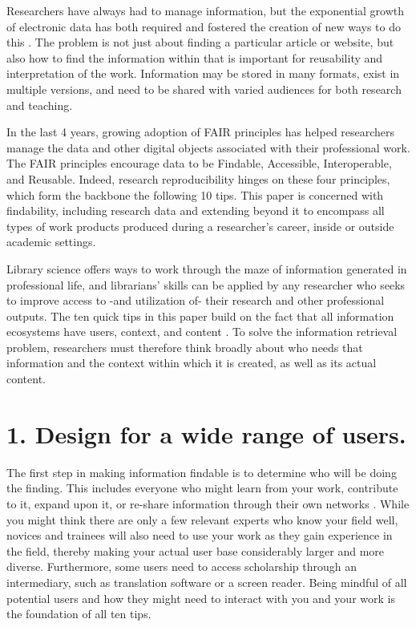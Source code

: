 \documentclass[10pt,letterpaper]{article}
\newcommand{\rulemajor}[1]{\section*{#1}}
\begin{document}
Researchers have always had to manage information, but the exponential growth of
electronic data has both required and fostered the creation of new ways to do
this \cite{Rosenfeld2015,Hedden2016}. The problem is not just about finding a
particular article or website, but also how to find the information within that is 
important for reusability and interpretation of the work. Information may be stored
in many formats, exist in multiple versions, and need to be shared with varied audiences
for both research and teaching.

In the last 4 years, growing adoption of FAIR principles \cite{Wilkinson2016}
has helped researchers manage the data and other digital objects associated with
their professional work. The FAIR principles encourage data to be Findable,
Accessible, Interoperable, and Reusable. Indeed, research reproducibility
hinges on these four principles, which form the backbone the following 10 tips.
This paper is concerned with findability, including research data and
extending beyond it to encompass all types of work products produced during a
researcher's career, inside or outside academic settings.

Library science offers ways to work through the maze of information generated in
professional life, and librarians' skills can be applied by any researcher who
seeks to improve access to -and utilization of- their research and other 
professional outputs. The ten quick tips in this paper build on the fact that all
information ecosystems have users, context, and content \cite{Rosenfeld2015}.
To solve the information retrieval problem, researchers must therefore think
broadly about who needs that information and the context within which it is
created, as well as its actual content.

\rulemajor{1. Design for a wide range of users.}

The first step in making information findable is to determine who will be doing
the finding. This includes everyone who might learn from your work, contribute
to it, expand upon it, or re-share information through their own networks
\cite{Covert2014}. While you might think there are only a few relevant experts
who know your field well, novices and trainees will also need to use your work
as they gain experience in the field, thereby making your actual user base
considerably larger and more diverse. Furthermore, some users need to access
scholarship through an intermediary, such as translation software or a screen
reader. Being mindful of all potential users and how they might need to
interact with you and your work is the foundation of all ten tips.
\end{document}
